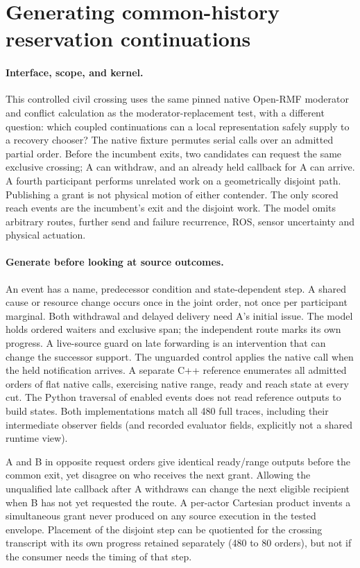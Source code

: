 \documentclass{article}
\begin{document}
\section*{Generating common-history reservation continuations}
\paragraph{Interface, scope, and kernel.}
This controlled civil crossing uses the same pinned native Open-RMF
moderator and conflict calculation as the moderator-replacement test,
with a different question: which coupled continuations can a local
representation safely supply to a recovery chooser? The native fixture
permutes serial calls over an admitted partial order. Before the incumbent
exits, two candidates can request the same exclusive crossing; A can
withdraw, and an already held callback for A can arrive. A fourth
participant performs unrelated work on a geometrically disjoint path.
Publishing a grant is not physical motion of either contender. The only
scored reach events are the incumbent's exit and the disjoint work.
The model omits arbitrary routes, further send and failure recurrence,
ROS, sensor uncertainty and physical actuation.

\paragraph{Generate before looking at source outcomes.}
An event has a name, predecessor condition and state-dependent step.
A shared cause or resource change occurs once in the joint order, not
once per participant marginal. Both withdrawal and delayed delivery need
A's initial issue. The model holds ordered waiters and exclusive span;
the independent route marks its own progress. A live-source guard on
late forwarding is an intervention that can change the successor support.
The unguarded control applies the native call when the held notification
arrives. A separate C++ reference enumerates all admitted orders of flat
native calls, exercising native range, ready and reach state at every
cut. The Python traversal of enabled events does not read reference
outputs to build states. Both implementations match all 480 full traces,
including their intermediate observer fields (and recorded evaluator
fields, explicitly not a shared runtime view).

A and B in opposite request orders give identical ready/range outputs
before the common exit, yet disagree on who receives the next grant.
Allowing the unqualified late callback after A withdraws can change
the next eligible recipient when B has not yet requested the route.
A per-actor Cartesian product invents a simultaneous grant never
produced on any source execution in the tested envelope. Placement of
the disjoint step can be quotiented for the crossing transcript with
its own progress retained separately (480 to 80 orders), but not if
the consumer needs the timing of that step.
\end{document}
